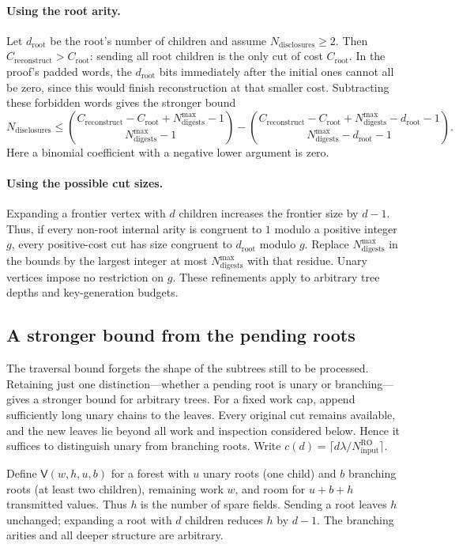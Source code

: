 \documentclass[10pt]{article}
\newcommand{\roinput}{N_{\mathrm{input}}^{\mathrm{RO}}}
\newcommand{\disclosurecount}{N_{\mathrm{disclosures}}}
\newcommand{\digestbudget}{N_{\mathrm{digests}}^{\max}}
\newcommand{\reconstructcost}{C_{\mathrm{reconstruct}}}
\begin{document}
\paragraph{Using the root arity.} Let $d_{\mathrm{root}}$ be the root's number of children and assume $\disclosurecount\ge2$. Then $\reconstructcost>C_{\mathrm{root}}$: sending all root children is the only cut of cost $C_{\mathrm{root}}$. In the proof's padded words, the $d_{\mathrm{root}}$ bits immediately after the initial ones cannot all be zero, since this would finish reconstruction at that smaller cost. Subtracting these forbidden words gives the stronger bound
\begin{equation}\label{eq:root-arity-bound}
 \disclosurecount\le\binom{\reconstructcost-C_{\mathrm{root}}+\digestbudget-1}{\digestbudget-1}-\binom{\reconstructcost-C_{\mathrm{root}}+\digestbudget-d_{\mathrm{root}}-1}{\digestbudget-d_{\mathrm{root}}-1}.
\end{equation}
Here a binomial coefficient with a negative lower argument is zero.

\paragraph{Using the possible cut sizes.} Expanding a frontier vertex with $d$ children increases the frontier size by $d-1$. Thus, if every non-root internal arity is congruent to $1$ modulo a positive integer $g$, every positive-cost cut has size congruent to $d_{\mathrm{root}}$ modulo $g$. Replace $\digestbudget$ in the bounds by the largest integer at most $\digestbudget$ with that residue. Unary vertices impose no restriction on $g$. These refinements apply to arbitrary tree depths and key-generation budgets.

\subsection{A stronger bound from the pending roots}\label{sec:pending-root-bound}
The traversal bound forgets the shape of the subtrees still to be processed. Retaining just one distinction---whether a pending root is unary or branching---gives a stronger bound for arbitrary trees. For a fixed work cap, append sufficiently long unary chains to the leaves. Every original cut remains available, and the new leaves lie beyond all work and inspection considered below. Hence it suffices to distinguish unary from branching roots. Write $c(d)=\lceil d\lambda/\roinput\rceil$.

Define $\mathsf V(w,h,u,b)$ for a forest with $u$ unary roots (one child) and $b$ branching roots (at least two children), remaining work $w$, and room for $u+b+h$ transmitted values. Thus $h$ is the number of spare fields. Sending a root leaves $h$ unchanged; expanding a root with $d$ children reduces $h$ by $d-1$. The branching arities and all deeper structure are arbitrary.
\end{document}

